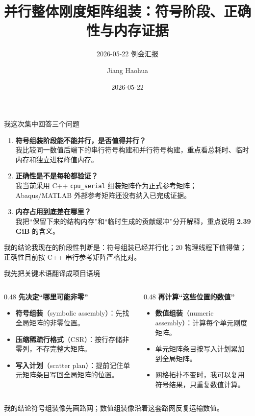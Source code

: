 \documentclass[UTF8,aspectratio=169,10pt]{ctexbeamer}
\title[20260522 例会]{并行整体刚度矩阵组装：符号阶段、正确性与内存证据}
\subtitle{2026-05-22 例会汇报}
\author{Jiang Haohua}
\date{2026-05-22}
\newcommand{\term}[1]{\textcolor{pgsaBlue}{\textbf{#1}}}
\newcommand{\metric}[1]{\textcolor{pgsaGreen}{\textbf{#1}}}
\newcommand{\code}[1]{\texttt{#1}}
\newcommand{\mytake}[1]{\begin{block}{我的结论}#1\end{block}}
\begin{document}
\begin{frame}
  \titlepage
\end{frame}

\begin{frame}{我这次集中回答三个问题}
\begin{enumerate}
  \item \term{符号组装阶段能不能并行，是否值得并行？}\\
  我比较同一数值后端下的串行符号构建和并行符号构建，重点看总耗时、临时内存和独立进程峰值内存。
  \item \term{正确性是不是每轮都验证？}\\
  我当前采用 C++ \code{cpu\_serial} 组装矩阵作为正式参考矩阵；Abaqus/MATLAB 外部参考矩阵还没有纳入已完成证据。
  \item \term{内存占用到底差在哪里？}\\
  我把“保留下来的结构内存”和“临时生成的贡献缓冲”分开解释，重点说明 \metric{2.39 GiB} 的含义。
\end{enumerate}
\mytake{我现在的阶段性判断是：符号组装已经并行化；20 物理线程下值得做；正确性目前按 C++ 串行参考矩阵严格比对。}
\end{frame}

\begin{frame}{我先把关键术语翻译成项目语境}
\begin{columns}[T,onlytextwidth]
\begin{column}{0.48\textwidth}
\textbf{先决定“哪里可能非零”}
\begin{itemize}
  \item \term{符号组装}（symbolic assembly）：先找全局矩阵的非零位置。
  \item \term{压缩稀疏行格式}（CSR）：按行存储非零列，不存完整大矩阵。
  \item \term{写入计划}（scatter plan）：提前记住单元矩阵条目写回全局矩阵的位置。
\end{itemize}
\end{column}
\begin{column}{0.48\textwidth}
\textbf{再计算“这些位置的数值”}
\begin{itemize}
  \item \term{数值组装}（numeric assembly）：计算每个单元刚度矩阵。
  \item 单元矩阵条目按写入计划累加到全局矩阵。
  \item 网格拓扑不变时，我可以复用符号结果，只重复数值计算。
\end{itemize}
\end{column}
\end{columns}
\mytake{符号组装像先画路网；数值组装像沿着这套路网反复运输数值。}
\end{frame}
\end{document}
